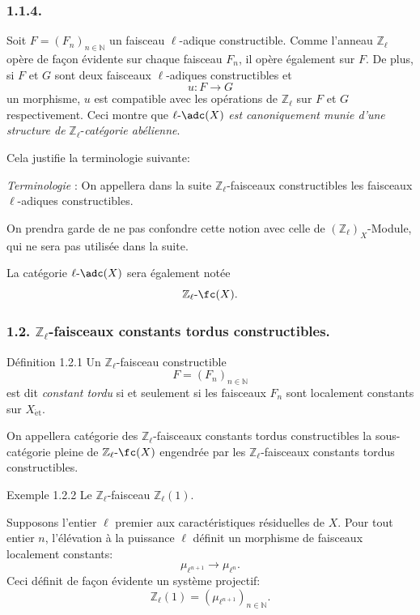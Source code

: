 \subsubsection*{1.1.4.}
Soit \(F=(F_n)_{n\in\mathbb{N}}\) un faisceau \(\ell\)-adique constructible. Comme l'anneau \(\mathbb{Z}_\ell\) opère de façon évidente sur chaque faisceau \(F_n\), il opère également sur \(F\). De plus, si \(F\) et \(G\) sont deux faisceaux \(\ell\)-adiques constructibles et
\[
u:F\longrightarrow G
\]
un
morphisme, \(u\) est compatible avec les opérations de \(\mathbb{Z}_\ell\) sur \(F\) et \(G\) respectivement. Ceci montre que \(\ell\text{-}\adc(X)\) \emph{est canoniquement munie d'une structure de} \(\mathbb{Z}_\ell\)-\emph{catégorie abélienne}.

Cela justifie la terminologie suivante:

\emph{Terminologie} : On appellera dans la suite \(\mathbb{Z}_\ell\)-faisceaux constructibles les faisceaux \(\ell\)-adiques constructibles.

On prendra garde de ne pas confondre cette notion avec celle de \((\mathbb{Z}_\ell)_X\)-Module, qui ne sera pas utilisée dans la suite.

La catégorie \(\ell\text{-}\adc(X)\) sera également notée
\[
\mathbb{Z}_\ell\text{-}\fc(X).
\]

\subsubsection*{1.2. \(\mathbb{Z}_\ell\)-faisceaux constants tordus constructibles.}

\begin{statement}{Définition 1.2.1}
Un \(\mathbb{Z}_\ell\)-faisceau constructible
\[
F=(F_n)_{n\in\mathbb{N}}
\]
est dit \emph{constant tordu} si et seulement si les faisceaux \(F_n\) sont localement constants sur \(X_{\mathrm{\acute et}}\).
\end{statement}

On appellera catégorie des \(\mathbb{Z}_\ell\)-faisceaux constants tordus constructibles la sous-catégorie pleine de \(\mathbb{Z}_\ell\text{-}\fc(X)\) engendrée par les \(\mathbb{Z}_\ell\)-faisceaux constants tordus constructibles.

\begin{statement}{Exemple 1.2.2}
Le \(\mathbb{Z}_\ell\)-faisceau \(\mathbb{Z}_\ell(1)\).
\end{statement}

Supposons l'entier \(\ell\) premier aux caractéristiques résiduelles de \(X\). Pour tout entier \(n\), l'élévation à la puissance \(\ell\) définit un morphisme de
faisceaux localement constants:
\[
\mu_{\ell^{n+1}}\longrightarrow \mu_{\ell^n}.
\]
Ceci définit de façon évidente un système projectif:
\[
\mathbb{Z}_\ell(1)=(\mu_{\ell^{n+1}})_{n\in\mathbb{N}}.
\]

